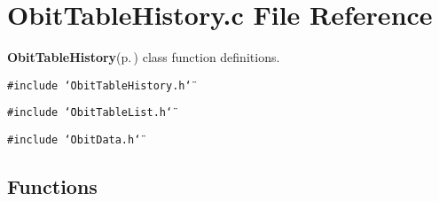 \section{Obit\-Table\-History.c File Reference}
\label{ObitTableHistory_8c}
{\bf Obit\-Table\-History}{\rm (p.\,\pageref{structObitTableHistory})} class function definitions. 

{\tt \#include \char`\"{}Obit\-Table\-History.h\char`\"{}}\par
{\tt \#include \char`\"{}Obit\-Table\-List.h\char`\"{}}\par
{\tt \#include \char`\"{}Obit\-Data.h\char`\"{}}\par
\subsection*{Functions}
